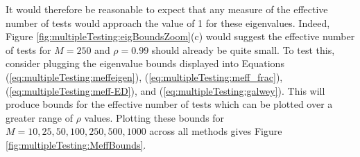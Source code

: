 \documentclass[letterpaper,12pt,oneside,final]{article}
\begin{document}
It would therefore be reasonable to expect that any measure of the effective number of tests would approach the value of 1 for these eigenvalues. Indeed, Figure \ref{fig:multipleTesting:eigBoundsZoom}(c) would suggest the effective number of tests for $M = 250$ and $\rho = 0.99$ should already be quite small.
To test this, consider plugging the eigenvalue bounds displayed into Equations (\ref{eq:multipleTesting:meffeigen}), (\ref{eq:multipleTesting:meff_frac}), (\ref{eq:multipleTesting:meff-ED}), and (\ref{eq:multipleTesting:galwey}). This will produce bounds for the effective number of tests which can be plotted over a greater range of $\rho$ values. Plotting these bounds for $M = 10, 25, 50, 100, 250, 500, 1000$ across all methods gives Figure \ref{fig:multipleTesting:MeffBounds}.
\end{document}
